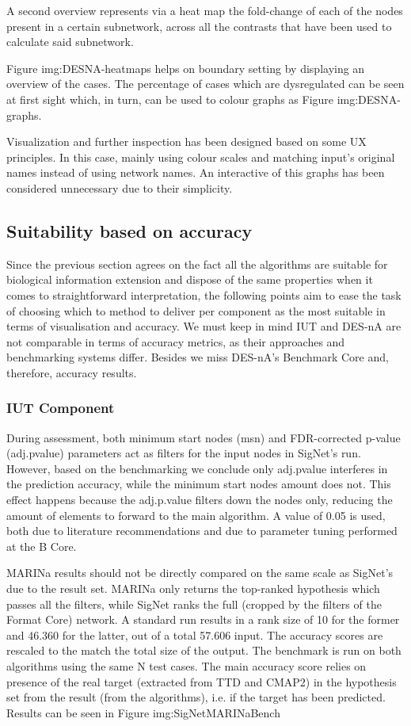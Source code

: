 A second overview represents via a heat map the fold-change of each of the nodes present in a certain subnetwork, across all the contrasts that have been used to calculate said subnetwork. 

Figure img:DESNA-heatmaps helps on boundary setting by displaying an overview of the cases. The percentage of cases which are dysregulated can be seen at first sight which, in turn, can be used to colour graphs as Figure img:DESNA-graphs. 

Visualization and further inspection has been designed based on some UX principles. In this case, mainly using colour scales and matching input’s original names instead of using network names. An interactive of this graphs has been considered unnecessary due to their simplicity.

\subsection{Suitability based on accuracy}
Since the previous section agrees on the fact all the algorithms are suitable for biological information extension and dispose of the same properties when it comes to straightforward interpretation, the following points aim to ease the task of choosing which to method to deliver per component as the most suitable in terms of visualisation and accuracy.
We must keep in mind IUT and DES-nA are not comparable in terms of accuracy metrics, as their approaches and benchmarking systems differ. Besides we miss DES-nA’s Benchmark Core and, therefore, accuracy results.

\subsubsection{IUT Component}
During assessment, both minimum start nodes (msn) and FDR-corrected p-value (adj.pvalue) parameters act as filters for the input nodes in SigNet’s run. However, based on the benchmarking we conclude only adj.pvalue interferes in the prediction accuracy, while the minimum start nodes amount does not. This effect happens because the adj.p.value filters down the nodes only, reducing the amount of elements to forward to the main algorithm. A value of 0.05 is used, both due to literature recommendations and due to parameter tuning performed at the B Core.

MARINa results should not be directly compared on the same scale as SigNet’s due to the result set. MARINa only returns the top-ranked hypothesis which passes all the filters, while SigNet ranks the full (cropped by the filters of the Format Core) network. A standard run results in a rank size of 10 for the former and 46.360 for the latter, out of a total 57.606 input. The accuracy scores are rescaled to the match the total size of the output.
The benchmark is run on both algorithms using the same N test cases. The main accuracy score relies on presence of the real target (extracted from TTD and CMAP2) in the hypothesis set from the result (from the algorithms), i.e. if the target has been predicted. Results can be seen in Figure img:SigNetMARINaBench

